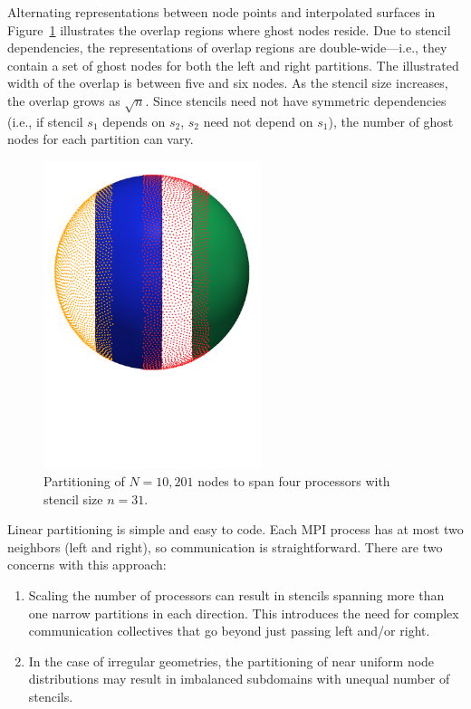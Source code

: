 \documentclass{report}
\begin{document}
Alternating representations between node points and interpolated surfaces in Figure~\ref{fig:decomposed_sphere} illustrates the
overlap regions where ghost nodes reside. Due to stencil dependencies, the representations of overlap regions are double-wide---i.e., they contain a set of ghost nodes for both the left and right partitions. The illustrated width of the overlap is between five and six nodes. As the stencil size increases, the overlap grows as $\sqrt{n}$. Since stencils need not have symmetric dependencies (i.e., if stencil $s_1$ depends on $s_2$, $s_2$ need not depend on $s_1$), the number of ghost nodes for each partition can vary. 

\begin{figure}[ht!]
\begin{center}
\includegraphics[width=2.5in]{../figures/paper1/figures/vortex_rollup/4procs_N10K_n31.pdf}
\caption{Partitioning of $N=10,201$ nodes to span four processors with stencil size $n=31$. }
\label{fig:decomposed_sphere}
\end{center}
\end{figure}

Linear partitioning is simple and easy to code. Each MPI process has at most two neighbors (left and right), so communication is straightforward. There are two concerns with this approach: 
\begin{enumerate} 
\item Scaling the number of processors can result in stencils spanning more than one narrow partitions in each direction. This introduces the need for complex communication collectives that go beyond just passing left and/or right.
\item In the case of irregular geometries, the partitioning of near uniform node distributions may result in imbalanced subdomains with unequal number of stencils.
\end{enumerate}
\end{document}
